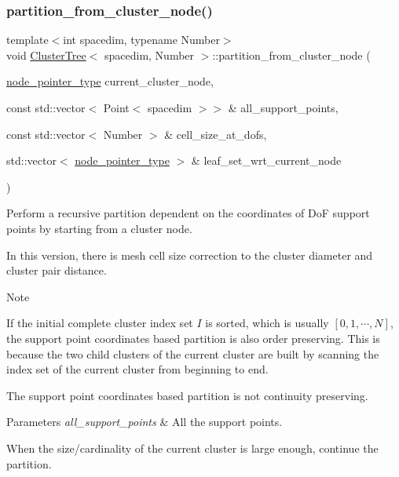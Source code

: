 \subsubsection{\texorpdfstring{partition\+\_\+from\+\_\+cluster\+\_\+node()}{partition\_from\_cluster\_node()}\hspace{0.1cm}{\footnotesize\ttfamily [3/3]}}
{\footnotesize\ttfamily template$<$int spacedim, typename Number$>$ \\
void \hyperlink{classClusterTree}{Cluster\+Tree}$<$ spacedim, Number $>$\+::partition\+\_\+from\+\_\+cluster\+\_\+node (\begin{DoxyParamCaption}\item[{\hyperlink{classClusterTree_ae4bb0fdc7ac559d7844d04a00ab3e9de}{node\+\_\+pointer\+\_\+type}}]{current\+\_\+cluster\+\_\+node,  }\item[{const std\+::vector$<$ Point$<$ spacedim $>$$>$ \&}]{all\+\_\+support\+\_\+points,  }\item[{const std\+::vector$<$ Number $>$ \&}]{cell\+\_\+size\+\_\+at\+\_\+dofs,  }\item[{std\+::vector$<$ \hyperlink{classClusterTree_ae4bb0fdc7ac559d7844d04a00ab3e9de}{node\+\_\+pointer\+\_\+type} $>$ \&}]{leaf\+\_\+set\+\_\+wrt\+\_\+current\+\_\+node }\end{DoxyParamCaption})\hspace{0.3cm}{\ttfamily [private]}}

Perform a recursive partition dependent on the coordinates of DoF support points by starting from a cluster node.

In this version, there is mesh cell size correction to the cluster diameter and cluster pair distance.


\begin{DoxyDescription}
\item[Note ]
\begin{DoxyEnumerate}
\item If the initial complete cluster index set $I$ is sorted, which is usually $[0, 1, \cdots, N]$, the support point coordinates based partition is also order preserving. This is because the two child clusters of the current cluster are built by scanning the index set of the current cluster from beginning to end.
\item The support point coordinates based partition is not continuity preserving.  
\end{DoxyEnumerate}
\end{DoxyDescription}


\begin{DoxyParams}{Parameters}
{\em all\+\_\+support\+\_\+points} & All the support points. \\
\hline
\end{DoxyParams}
When the size/cardinality of the current cluster is large enough, continue the partition.

